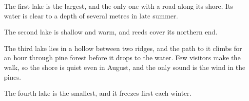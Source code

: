 \documentclass{article}
\begin{document}
\fontsize{20}{24}\selectfont
The first lake is the largest, and the only one with a road along its shore. Its
water is clear to a depth of several metres in late summer.

The second lake is shallow and warm, and reeds cover its northern end.

The third lake lies in a hollow between two ridges, and the path to it climbs for an
hour through pine forest before it drops to the water. Few visitors make the walk, so
the shore is quiet even in August, and the only sound is the wind in the pines.

The fourth lake is the smallest, and it freezes first each winter.
\end{document}

